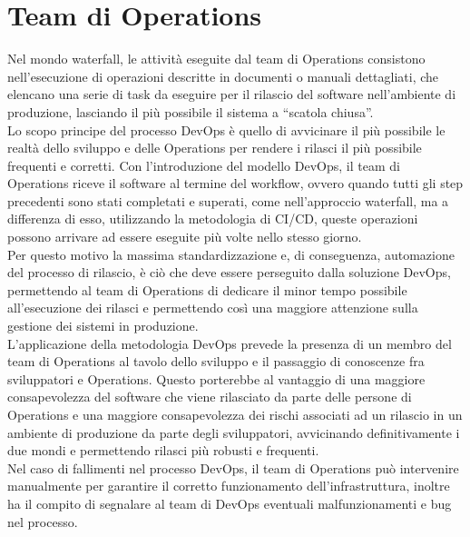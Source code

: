 \documentclass[a4paper, 12pt]{report}
\numberwithin{equation}{section}
\begin{document}
\section{Team di Operations}
Nel mondo waterfall, le attività eseguite dal team di Operations consistono nell’esecuzione di operazioni descritte in documenti o manuali dettagliati, che elencano una serie di task da eseguire per il rilascio del software nell’ambiente di produzione, lasciando il più possibile il sistema a “scatola chiusa”.\\
Lo scopo principe del processo DevOps è quello di avvicinare il più possibile le realtà dello sviluppo e delle Operations per rendere i rilasci il più possibile frequenti e corretti.
Con l’introduzione del modello DevOps, il team di Operations riceve il software al termine del workflow, ovvero quando tutti gli step precedenti sono stati completati e superati, come nell’approccio waterfall, ma a differenza di esso, utilizzando la metodologia di CI/CD, queste operazioni possono arrivare ad essere eseguite più volte nello stesso giorno.\\
Per questo motivo la massima standardizzazione e, di conseguenza, automazione del processo di rilascio, è ciò che deve essere perseguito dalla soluzione DevOps, permettendo al team di Operations di dedicare il minor tempo possibile all’esecuzione dei rilasci e permettendo così una maggiore attenzione sulla gestione dei sistemi in produzione.\\
L’applicazione della metodologia DevOps prevede la presenza di un membro del team di Operations al tavolo dello sviluppo e il passaggio di conoscenze fra sviluppatori e Operations. Questo porterebbe al vantaggio di una maggiore consapevolezza del software che viene rilasciato da parte delle persone di Operations e una maggiore consapevolezza dei rischi associati ad un rilascio in un ambiente di produzione da parte degli sviluppatori, avvicinando definitivamente i due mondi e permettendo rilasci più robusti e frequenti. \\
Nel caso di fallimenti nel processo DevOps, il team di Operations può intervenire manualmente per garantire il corretto funzionamento dell’infrastruttura, inoltre ha il compito di segnalare al team di DevOps eventuali malfunzionamenti e bug nel processo.
\end{document}
